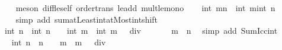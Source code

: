 \begin{isabellebody}
\ \ \ \ \isamarkupfalse%
\ {\isacharparenleft}{\kern0pt}meson\ diff{\isacharunderscore}{\kern0pt}le{\isacharunderscore}{\kern0pt}self\ order{\isacharunderscore}{\kern0pt}trans\ le{\isacharunderscore}{\kern0pt}add{}\ mult{\isacharunderscore}{\kern0pt}le{\isacharunderscore}{\kern0pt}mono{\isacharparenright}{\kern0pt}\isanewline
\ \ \isamarkupfalse%
\ {\isachardoublequoteopen}int\ {\isacharparenleft}{\kern0pt}{\isasymSum}{\isacharbraceleft}{\kern0pt}m{\isachardot}{\kern0pt}{\isachardot}{\kern0pt}n{\isacharbraceright}{\kern0pt}{\isacharparenright}{\kern0pt}\ {\isacharequal}{\kern0pt}\ {\isacharparenleft}{\kern0pt}{\isasymSum}{\isacharbraceleft}{\kern0pt}int\ m{\isachardot}{\kern0pt}{\isachardot}{\kern0pt}int\ n{\isacharbraceright}{\kern0pt}{\isacharparenright}{\kern0pt}{\isachardoublequoteclose}\isanewline
\ \ \ \ \isamarkupfalse%
\ {\isacharparenleft}{\kern0pt}simp\ add{\isacharcolon}{\kern0pt}\ sum{\isachardot}{\kern0pt}atLeast{\isacharunderscore}{\kern0pt}int{\isacharunderscore}{\kern0pt}atMost{\isacharunderscore}{\kern0pt}int{\isacharunderscore}{\kern0pt}shift{\isacharparenright}{\kern0pt}\isanewline
\ \ \isamarkupfalse%
\ \isamarkupfalse%
\ {\isachardoublequoteopen}{\isasymdots}\ {\isacharequal}{\kern0pt}\ {\isacharparenleft}{\kern0pt}int\ n\ {\isacharasterisk}{\kern0pt}\ {\isacharparenleft}{\kern0pt}int\ n\ {\isacharplus}{\kern0pt}\ {}{\isacharparenright}{\kern0pt}\ {\isacharminus}{\kern0pt}\ int\ m\ {\isacharasterisk}{\kern0pt}\ {\isacharparenleft}{\kern0pt}int\ m\ {\isacharminus}{\kern0pt}\ {}{\isacharparenright}{\kern0pt}{\isacharparenright}{\kern0pt}\ div\ {}{\isachardoublequoteclose}\isanewline
\ \ \ \ \isamarkupfalse%
\ {\isacartoucheopen}m\ {\isasymle}\ n{\isacartoucheclose}\ \isamarkupfalse%
\ {\isacharparenleft}{\kern0pt}simp\ add{\isacharcolon}{\kern0pt}\ Sum{\isacharunderscore}{\kern0pt}Icc{\isacharunderscore}{\kern0pt}int{\isacharparenright}{\kern0pt}\isanewline
\ \ \isamarkupfalse%
\ \isamarkupfalse%
\ {\isachardoublequoteopen}{\isasymdots}\ {\isacharequal}{\kern0pt}\ int\ {\isacharparenleft}{\kern0pt}{\isacharparenleft}{\kern0pt}n\ {\isacharasterisk}{\kern0pt}\ {\isacharparenleft}{\kern0pt}n\ {\isacharplus}{\kern0pt}\ {}{\isacharparenright}{\kern0pt}\ {\isacharminus}{\kern0pt}\ m\ {\isacharasterisk}{\kern0pt}\ {\isacharparenleft}{\kern0pt}m\ {\isacharminus}{\kern0pt}\ {}{\isacharparenright}{\kern0pt}{\isacharparenright}{\kern0pt}\ div\ {}{\isacharparenright}{\kern0pt}{\isachardoublequoteclose}\isanewline

\end{isabellebody}
